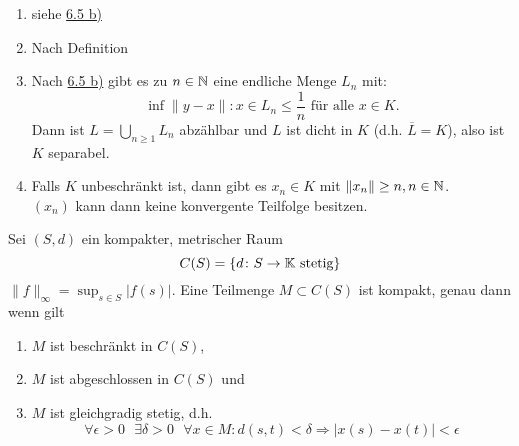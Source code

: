 \begin{beweis}
	\begin{enumerate}[label=\alph*\upshape)]
		\item siehe \hyperref[satz:6.5b]{6.5 b)}
		\item Nach Definition
		\item Nach \hyperref[satz:6.5b]{6.5 b)} gibt es zu $n \in \mathbb{N}$ eine endliche Menge $L_{n}$ mit:
			\[ \inf{\| y - x \| : x \in L_{n}} \leq \frac{1}{n} \text{ für alle } x \in K. \]
			Dann ist $L = \bigcup_{n \geq 1} L_{n}$ abzählbar und $L$ ist dicht in $K$ (d.h. $\overline{L} = K$), also ist $K$ separabel.
		\item Falls $K$ unbeschränkt ist, dann gibt es $x_{n} \in K$ mit $\|x_{n}\| \geq n, n \in \mathbb{N}$. \\
			$(x_{n})$ kann dann keine konvergente Teilfolge besitzen.
	\end{enumerate}
\end{beweis}


\begin{satz}  \label{satz:6.7-ArzelaAscoli}
	Sei $(S, d)$ ein kompakter, metrischer Raum
	\[ C(S) = \{ d \colon S \rightarrow \mathbb{K} \text{ stetig} \} \]
	$\| f \|_{\infty} = \sup_{s \in S} | f(s) |$. Eine Teilmenge $M \subset C(S)$ ist kompakt, genau dann wenn gilt
		\begin{enumerate}[label=\alph*\upshape)]
			\item $M$ ist beschränkt in $C(S)$,
			\item $M$ ist abgeschlossen in $C(S)$ und
			\item $M$ ist gleichgradig stetig, d.h.
				\[ \forall \epsilon > 0 \text{ } \exists \delta > 0 \text{ } \forall x \in M: d(s, t) < \delta \Rightarrow | x(s) - x(t) | < \epsilon \]
		\end{enumerate}
\end{satz}

